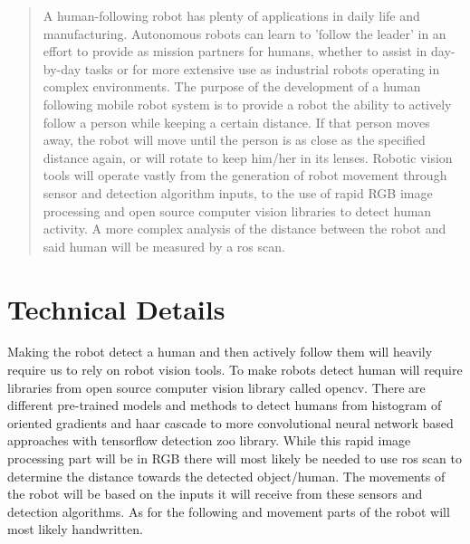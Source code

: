 \documentclass{ndjflart}
\theoremstyle{definition}
\theoremstyle{remark}
\begin{document}
\begin{frontmatter}
\begin{abstract}
 A human-following robot has plenty of applications in daily life and manufacturing. Autonomous robots can learn to 'follow the leader' in an effort to provide as mission partners for humans, whether to assist in day-by-day tasks or for more extensive use as industrial robots operating in complex environments. The purpose of the development of a human following mobile robot system is to provide a robot the ability to actively follow a person while keeping a certain distance. If that person moves away, the robot will move until the person is as close as the specified distance again, or will rotate to keep him/her in its lenses. Robotic vision tools will operate vastly from the generation of robot movement through sensor and detection algorithm inputs, to  the use of rapid RGB image processing and open source computer vision libraries to detect human activity. A more complex analysis of the distance between the robot and said human will be measured by a ros scan.
  
\end{abstract}

\begin{keyword}[class=AMS]
    
\end{keyword}

\begin{keyword}
   
\end{keyword}

\end{frontmatter}


\section{Technical Details}\label{intro}

Making the robot detect a human and then actively follow them will heavily require us to rely on robot vision tools. To make robots detect human will require libraries from open source computer vision library called opencv. There are different pre-trained models and methods to detect humans from histogram of oriented gradients and haar cascade to more convolutional neural network based approaches with tensorflow detection zoo library. While this rapid image processing part will be in RGB there will most likely be needed to use ros scan to determine the distance towards the detected object/human. The movements of the robot will be based on the inputs it will receive from these sensors and detection algorithms. As for the following and movement parts of the robot will most likely handwritten.
\end{document}
